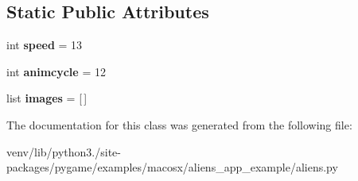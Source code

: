 \subsection*{Static Public Attributes}
\begin{DoxyCompactItemize}
\item 
\mbox{\label{classaliens_1_1_alien_af0889e938045e25797f31e55a594b527}} 
int {\bfseries speed} = 13
\item 
\mbox{\label{classaliens_1_1_alien_a4fa752c8f94d279c1202f3247334fc57}} 
int {\bfseries animcycle} = 12
\item 
\mbox{\label{classaliens_1_1_alien_aa6ac55175bbb18864ebd9d608616a3c5}} 
list {\bfseries images} = \mbox{[}$\,$\mbox{]}
\end{DoxyCompactItemize}


The documentation for this class was generated from the following file\+:\begin{DoxyCompactItemize}
\item 
venv/lib/python3./site-\/packages/pygame/examples/macosx/aliens\+\_\+app\+\_\+example/aliens.\+py\end{DoxyCompactItemize}
